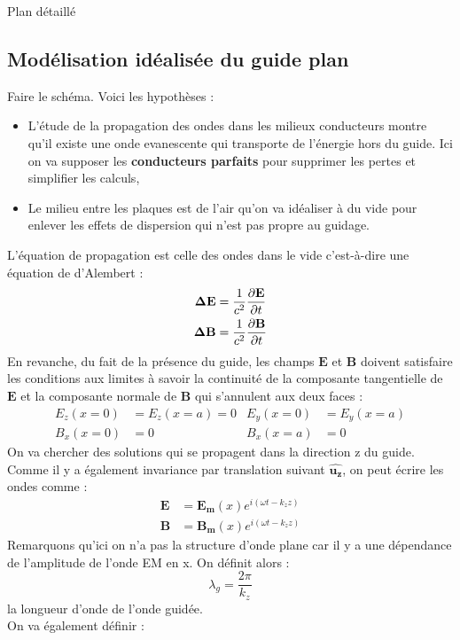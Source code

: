 \begin{reportBlock}{Plan détaillé}
  \subsection{Modélisation idéalisée du guide plan}
  Faire le schéma. Voici les hypothèses :
  \begin{itemize}
      \item L'étude de la propagation des ondes dans les milieux conducteurs montre qu'il existe une onde evanescente qui transporte de l'énergie hors du guide. Ici on va supposer les \textbf{conducteurs parfaits} pour supprimer les pertes et simplifier les calculs,
      \item Le milieu entre les plaques est de l'air qu'on va idéaliser à du vide pour enlever les effets de dispersion qui n'est pas propre au guidage.
  \end{itemize}
  L'équation de propagation est celle des ondes dans le vide c'est-à-dire une équation de d'Alembert :
  \begin{align}
      \mathbf{\Delta E} &= \frac{1}{c^2}\frac{\partial \mathbf{E}}{\partial t} \\
      \mathbf{\Delta B} &= \frac{1}{c^2}\frac{\partial \mathbf{B}}{\partial t}
  \end{align}
  En revanche, du fait de la présence du guide, les champs $\mathbf{E}$ et $\mathbf{B}$ doivent satisfaire les conditions aux limites à savoir la continuité de la composante tangentielle de $\mathbf{E}$ et la composante normale de $\mathbf{B}$ qui s'annulent aux deux faces :
  \begin{align}
      E_z(x=0)&=E_z(x=a)=0 & E_y(x=0)&=E_y(x=a)\\
      B_x(x=0)&=0 & B_x(x=a)&=0
  \end{align}
  On va chercher des solutions qui se propagent dans la direction z du guide. Comme il y a également invariance par translation suivant $\mathbf{\hat{u_z}}$, on peut écrire les ondes comme :
  \begin{align}
      \mathbf{E} &= \mathbf{E_m}(x)e^{i(\omega t - k_zz)}\\
      \mathbf{B} &= \mathbf{B_m}(x)e^{i(\omega t - k_zz)}
  \end{align}
  Remarquons qu'ici on n'a pas la structure d'onde plane car il y a une dépendance de l'amplitude de l'onde EM en x. On définit alors :
  \begin{equation}
      \lambda_g = \frac{2\pi}{k_z}
  \end{equation}
  la longueur d'onde de l'onde guidée.\\
  On va également définir :

\end{reportBlock}
